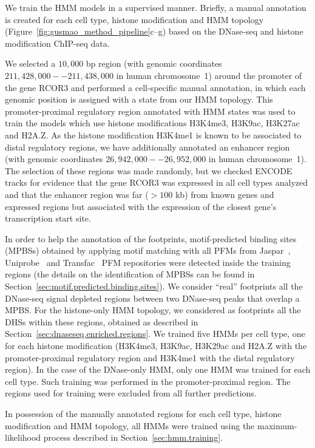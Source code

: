 We train the HMM models in a supervised manner. Briefly, a manual annotation is created for each cell type, histone modification and HMM topology (Figure~\ref{fig:gusmao_method_pipeline}c--g) based on the DNase-seq and histone modification ChIP-seq data.

We selected a $10,000$ bp region (with genomic coordinates $211,428,000--211,438,000$ in human chromosome~1) around the promoter of the gene RCOR3 and performed a cell-specific manual annotation, in which each genomic position is assigned with a state from our HMM topology. This promoter-proximal regulatory region annotated with HMM states was used to train the models which use histone modifications H3K4me3, H3K9ac, H3K27ac and H2A.Z. As the histone modification H3K4me1 is known to be associated to distal regulatory regions, we have additionally annotated an enhancer region (with genomic coordinates $26,942,000--26,952,000$ in human chromosome~1). The selection of these regions was made randomly, but we checked ENCODE~\cite{encode2012} tracks for evidence that the gene RCOR3 was expressed in all cell types analyzed and that the enhancer region was far ($>100$ kb) from known genes and expressed regions but associated with the expression of the closest gene's transcription start site.

In order to help the annotation of the footprints, motif-predicted binding sites (MPBSs) obtained by applying motif matching with all PFMs from Jaspar~\cite{mathelier2014}, Uniprobe~\cite{robasky2011} and Transfac~\cite{matys2006} PFM repositories were detected inside the training regions (the details on the identification of MPBSs can be found in Section~\ref{sec:motif.predicted.binding.sites}). We consider ``real'' footprints all the DNase-seq signal depleted regions between two DNase-seq peaks that overlap a MPBS. For the histone-only HMM topology, we considered as footprints all the DHSs within these regions, obtained as described in Section~\ref{sec:dnaseseq.enriched.regions}. We trained five HMMs per cell type, one for each histone modification (H3K4me3, H3K9ac, H3K29ac and H2A.Z with the promoter-proximal regulatory region and H3K4me1 with the distal regulatory region). In the case of the DNase-only HMM, only one HMM was trained for each cell type. Such training was performed in the promoter-proximal region. The regions used for training were excluded from all further predictions.

In possession of the manually annotated regions for each cell type, histone modification and HMM topology, all HMMs were trained using the maximum-likelihood process described in Section~\ref{sec:hmm.training}.

